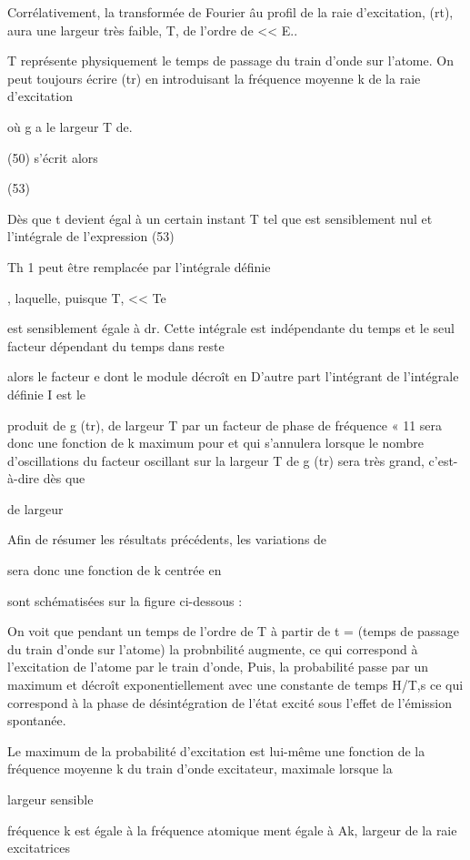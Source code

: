 Corrélativement, la transformée de Fourier âu profil de la raie
d'excitation, (rt), aura une largeur très faible, T, de l'ordre de  << E..

T représente physiquement le temps de passage du train d'onde sur l'atome.
On peut toujours écrire  (tr) en introduisant la fréquence
moyenne k de la raie d'excitation

où g a le largeur T de.

(50) s'écrit alors

(53)

Dès que t devient égal à un certain instant T tel que
 est sensiblement nul et l'intégrale de l'expression (53)



Th 1
peut être remplacée par l'intégrale définie

, laquelle, puisque T, << Te

est sensiblement égale à
dr. Cette intégrale est indépendante
du temps et le seul facteur dépendant du temps dans reste

alors le facteur e dont le module décroît en
D'autre part l'intégrant de l'intégrale définie I est le

produit de g (tr), de largeur T par un facteur de phase de fréquence
 « 11 sera donc une fonction de k maximum pour 
et qui s'annulera lorsque le nombre d'oscillations du facteur oscillant sur la
largeur T de g (tr) sera très grand, c'est-à-dire dès que

 de largeur

Afin de résumer les résultats précédents, les variations de

sera donc une fonction de k centrée en

sont schématisées sur la figure ci-dessous :

On voit que pendant un temps de l'ordre de T à partir de t =
(temps de passage du train d'onde sur l'atome) la probnbilité augmente, ce
qui correspond à l'excitation de l'atome par le train d'onde, Puis, la probabilité passe par un maximum et décroît exponentiellement avec une constante de
temps H/T,s ce qui correspond à la phase de désintégration de l'état excité
sous l'effet de l'émission spontanée.

Le maximum de la probabilité d'excitation est lui-même une fonction de la fréquence moyenne k du train d'onde excitateur, maximale lorsque la

largeur sensible

fréquence k est égale à la fréquence atomique
ment égale à Ak, largeur de la raie excitatrices

